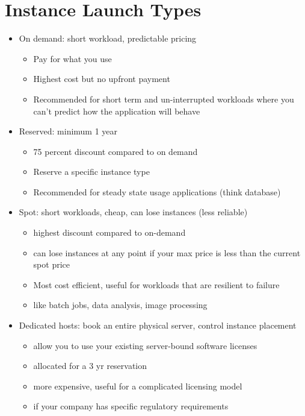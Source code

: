 \documentclass[]{scrartcl}
\begin{document}
\section{Instance Launch Types}
\begin{itemize}
	\item On demand: short workload, predictable pricing
	\begin{itemize}
		\item Pay for what you use
		\item Highest cost but no upfront payment
		\item Recommended for short term and un-interrupted workloads where you can't predict how the application will behave
	\end{itemize}
	\item Reserved: minimum 1 year
	\begin{itemize}
		\item 75 percent discount compared to on demand
		\item Reserve a specific instance type
		\item Recommended for steady state usage applications (think database)
	\end{itemize}
	\item Spot: short workloads, cheap, can lose instances (less reliable)
	\begin{itemize}
		\item highest discount compared to on-demand
		\item can lose instances at any point if your max price is less than the current spot price
		\item Most cost efficient, useful for workloads that are resilient to failure
		\item like batch jobs, data analysis, image processing
	\end{itemize}
	\item Dedicated hosts: book an entire physical server, control instance placement
	\begin{itemize}
		\item allow you to use your existing server-bound software licenses
		\item allocated for a 3 yr reservation
		\item more expensive, useful for a complicated licensing model
		\item if your company has specific regulatory requirements
	\end{itemize}
\end{itemize}
\end{document}
